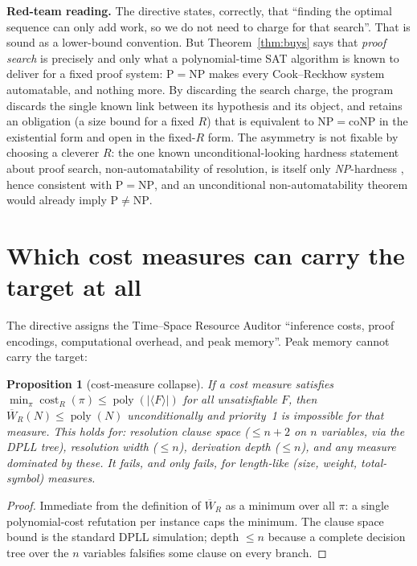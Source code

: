 \documentclass[11pt]{article}
\newtheorem{proposition}[theorem]{Proposition}
\theoremstyle{definition}
\newcommand{\poly}{\operatorname{poly}}
\newcommand{\cost}{\operatorname{cost}}
\newcommand{\Wbar}{\overline W}
\begin{document}
\noindent\textbf{Red-team reading.} The directive states, correctly, that
``finding the optimal sequence can only add work, so we do not need to charge
for that search''. That is sound as a lower-bound convention. But
Theorem~\ref{thm:buys} says that \emph{proof search} is precisely and only
what a polynomial-time SAT algorithm is known to deliver for a fixed proof
system: $\mathrm P=\mathrm{NP}$ makes every Cook--Reckhow system
automatable, and nothing more. By discarding the search charge, the program
discards the single known link between its hypothesis and its object, and
retains an obligation (a size bound for a fixed $R$) that is equivalent to
$\mathrm{NP}=\mathrm{coNP}$ in the existential form and open in the fixed-$R$
form. The asymmetry is not fixable by choosing a cleverer $R$: the one known
unconditional-looking hardness statement about proof search,
non-automatability of resolution, is itself only \emph{NP}-hardness
\cite{atseriasmuller20}, hence consistent with $\mathrm P=\mathrm{NP}$, and an
unconditional non-automatability theorem would already imply
$\mathrm P\neq\mathrm{NP}$.

\section{Which cost measures can carry the target at all}
\label{sec:cost}

The directive assigns the Time--Space Resource Auditor ``inference costs, proof
encodings, computational overhead, and peak memory''. Peak memory cannot carry
the target:

\begin{proposition}[cost-measure collapse]\label{prop:collapse}
If a cost measure satisfies
$\min_{\pi}\cost_R(\pi)\le\poly(|\langle F\rangle|)$ for all unsatisfiable $F$,
then $\Wbar_R(N)\le\poly(N)$ unconditionally and priority~1 is impossible for
that measure. This holds for: resolution \emph{clause space}
($\le n+2$ on $n$ variables, via the DPLL tree), resolution \emph{width}
($\le n$), derivation \emph{depth} ($\le n$), and any measure dominated by
these. It fails, and only fails, for length-like (size, weight, total-symbol)
measures.
\end{proposition}

\begin{proof}
Immediate from the definition of $\Wbar_R$ as a minimum over all $\pi$: a
single polynomial-cost refutation per instance caps the minimum. The clause
space bound is the standard DPLL simulation; depth $\le n$ because a complete
decision tree over the $n$ variables falsifies some clause on every branch.
\end{proof}
\end{document}
